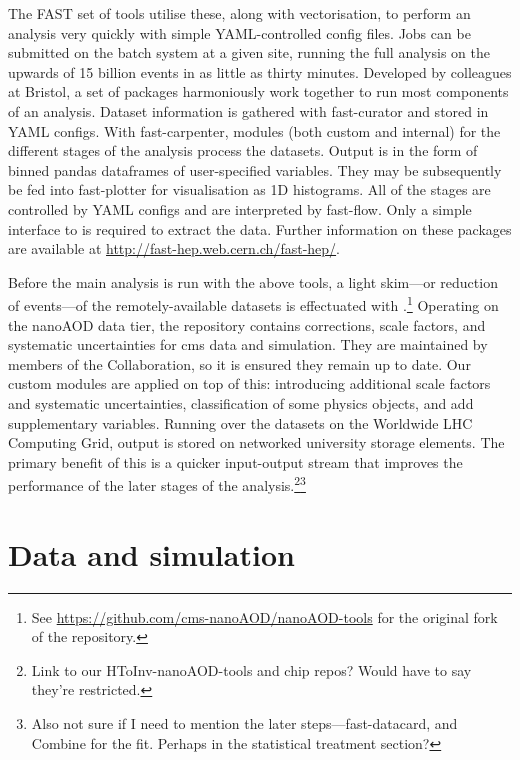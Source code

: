 The FAST set of tools utilise these, along with vectorisation, to perform an analysis very quickly with simple YAML-controlled config files. Jobs can be submitted on the batch system at a given site, running the full analysis on the upwards of 15 billion events in as little as thirty minutes. Developed by colleagues at Bristol, a set of packages harmoniously work together to run most components of an analysis. Dataset information is gathered with \textsf{fast-curator} and stored in YAML configs. With \textsf{fast-carpenter}, modules (both custom and internal) for the different stages of the analysis process the datasets. Output is in the form of binned \textsf{pandas} dataframes of user-specified variables. They may be subsequently be fed into \textsf{fast-plotter} for visualisation as 1D histograms. All of the stages are controlled by YAML configs and are interpreted by \textsf{fast-flow}. Only a simple interface to \ROOT is required to extract the data. Further information on these packages are available at \url{http://fast-hep.web.cern.ch/fast-hep/}.

Before the main analysis is run with the above tools, a light skim---or reduction of events---of the remotely-available datasets is effectuated with \nanoAODtools.\footnote{See \url{https://github.com/cms-nanoAOD/nanoAOD-tools} for the original fork of the repository.} Operating on the nanoAOD data tier, the repository contains corrections, scale factors, and systematic uncertainties for \acrshort{cms} data and simulation. They are maintained by members of the Collaboration, so it is ensured they remain up to date. Our custom modules are applied on top of this: introducing additional scale factors and systematic uncertainties, classification of some physics objects, and add supplementary variables. Running over the datasets on the Worldwide LHC Computing Grid, output is stored on networked university storage elements. The primary benefit of this is a quicker input-output stream that improves the performance of the later stages of the analysis.\footnote{Link to our HToInv-nanoAOD-tools and chip repos? Would have to say they're restricted.}\footnote{Also not sure if I need to mention the later steps---\textsf{fast-datacard}, and Combine for the fit. Perhaps in the statistical treatment section?}




\section{Data and simulation}
\label{sec:htoinv_data_sim}


